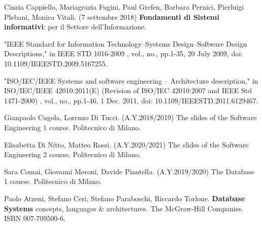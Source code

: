 \documentclass[a4paper,12pt]{report}
\begin{document}
\begin{thebibliography}{9}

Cinzia Cappiello, Mariagrazia Fugini, Paul Grefen, Barbara Pernici, Pierluigi Plebani, Monica Vitali. (7 settembre 2018)  \textbf{Fondamenti di Sistemi informativi}: per il Settore dell'Informazione.

"IEEE Standard for Information Technology--Systems Design--Software Design Descriptions," in IEEE STD 1016-2009 , vol., no., pp.1-35, 20 July 2009, doi: 10.1109/IEEESTD.2009.5167255.

"ISO/IEC/IEEE Systems and software engineering -- Architecture description," in ISO/IEC/IEEE 42010:2011(E) (Revision of ISO/IEC 42010:2007 and IEEE Std 1471-2000) , vol., no., pp.1-46, 1 Dec.
2011, doi: 10.1109/IEEESTD.2011.6129467.

Gianpaolo Cugola, Lorenzo Di Tucci. (A.Y.2018/2019) The slides of the Software Engineering 1 course.
Politecnico di Milano.

Elisabetta Di Nitto, Matteo Rossi. (A.Y.2020/2021) The slides of the Software Engineering 2 course.
Politecnico di Milano.

Sara Comai, Giovanni Meroni, Davide Piantella. (A.Y.2019/2020) The Database 1 course.
Politecnico di Milano.

Paolo Atzeni, Stefano Ceri, Stefano Paraboschi, Riccardo Torlone. \textbf{Database Systems} concepts, languages \& architectures.
The McGraw-Hill Companies.
ISBN 007-709500-6.


\end{thebibliography}
\end{document}
